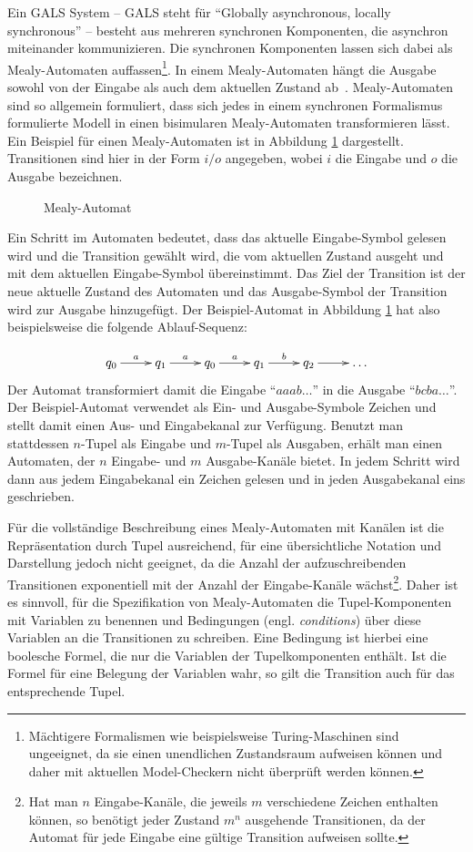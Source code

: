 Ein GALS System -- GALS steht für "`Globally asynchronous, locally synchronous"' -- besteht aus mehreren synchronen Komponenten, die asynchron miteinander kommunizieren.
Die synchronen Komponenten lassen sich dabei als Mealy-Automaten auffassen\footnote{Mächtigere Formalismen wie beispielsweise Turing-Maschinen sind ungeeignet, da sie einen unendlichen Zustandsraum aufweisen können und daher mit aktuellen Model-Checkern nicht überprüft werden können.}.
In einem Mealy-Automaten hängt die Ausgabe sowohl von der Eingabe als auch dem aktuellen Zustand ab~\cite{Mealy}.
Mealy-Automaten sind so allgemein formuliert, dass sich jedes in einem synchronen Formalismus formulierte Modell in einen bisimularen Mealy-Automaten transformieren lässt.
Ein Beispiel für einen Mealy-Automaten ist in Abbildung \ref{fig:mealy} dargestellt.
Transitionen sind hier in der Form $i/o$ angegeben, wobei $i$ die Eingabe und $o$ die Ausgabe bezeichnen.
\begin{figure}[h]
  \centering
  
  \caption{Mealy-Automat}
  \label{fig:mealy}
\end{figure}

Ein Schritt im Automaten bedeutet, dass das aktuelle Eingabe-Symbol gelesen wird und die Transition gewählt wird, die vom aktuellen Zustand ausgeht und mit dem aktuellen Eingabe-Symbol übereinstimmt.
Das Ziel der Transition ist der neue aktuelle Zustand des Automaten und das Ausgabe-Symbol der Transition wird zur Ausgabe hinzugefügt.
Der Beispiel-Automat in Abbildung \ref{fig:mealy} hat also beispielsweise die folgende Ablauf-Sequenz:

\[ \xymatrix {
     q_0\ar[r]^a &  q_1 \ar[r]^a & q_0 \ar[r]^a & q_1 \ar[r]^b & q_2\ar[r] & \dots
   } \]
Der Automat transformiert damit die Eingabe "`$aaab\dots$"' in die Ausgabe "`$bcba\dots$"'.
Der Beispiel-Automat verwendet als Ein- und Ausgabe-Symbole Zeichen und stellt damit einen Aus- und Eingabekanal zur Verfügung.
Benutzt man stattdessen $n$-Tupel als Eingabe und $m$-Tupel als Ausgaben, erhält man einen Automaten, der $n$ Eingabe- und $m$ Ausgabe-Kanäle bietet.
In jedem Schritt wird dann aus jedem Eingabekanal ein Zeichen gelesen und in jeden Ausgabekanal eins geschrieben.

Für die vollständige Beschreibung eines Mealy-Automaten mit Kanälen ist die Repräsentation durch Tupel ausreichend, für eine übersichtliche Notation und Darstellung jedoch nicht geeignet, da die Anzahl der aufzuschreibenden Transitionen exponentiell mit der Anzahl der Eingabe-Kanäle wächst\footnote{Hat man $n$ Eingabe-Kanäle, die jeweils $m$ verschiedene Zeichen enthalten können, so benötigt jeder Zustand $m^n$ ausgehende Transitionen, da der Automat für jede Eingabe eine gültige Transition aufweisen sollte.}.
Daher ist es sinnvoll, für die Spezifikation von Mealy-Automaten die Tupel-Komponenten mit Variablen zu benennen und Bedingungen (engl. \emph{conditions}) über diese Variablen an die Transitionen zu schreiben.
Eine Bedingung ist hierbei eine boolesche Formel, die nur die Variablen der Tupelkomponenten enthält.
Ist die Formel für eine Belegung der Variablen wahr, so gilt die Transition auch für das entsprechende Tupel.

